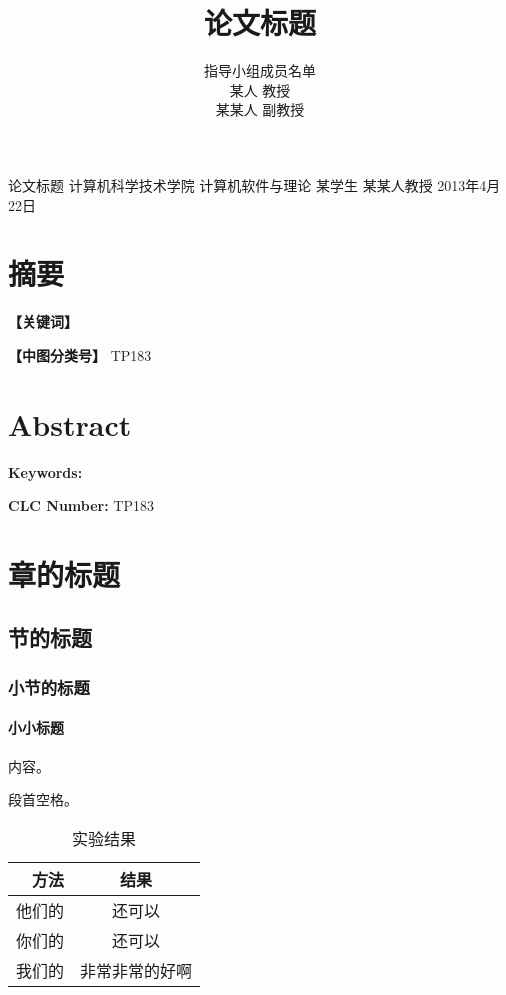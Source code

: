 \documentclass{fudan}
\title{论文标题}
\author{
指导小组成员名单\vspace{1em}\\
某\hspace{1em}人 \hspace{1em} 教\hspace{1em}授\\
某某人 \hspace{1em} 副教授\\
}
\date{}
\begin{document}
%
{论文标题}%
{计算机科学技术学院}%
{计算机软件与理论}%
{某学生}%
{某某人\hspace{1.5em}教授}%
{2013年4月22日}

\maketitle

\tableofcontents

\frontmatter

\chapter{摘\hspace{1.5em}要}

\textbf{【关键词】}

\textbf{【中图分类号】} TP183

\chapter{Abstract}

\textbf{Keywords:}

\textbf{CLC Number:} TP183

\mainmatter

\chapter{章的标题}

\section{节的标题}

\subsection{小节的标题}

\subsubsection{小小标题}

内容。

段首空格。

\begin{table}[!h]
\begin{center}
\begin{tabular}{r|c}
\hline\hline
方法 & 结果 \\
\hline
他们的 & 还可以 \\
你们的 & 还可以 \\
我们的 & 非常非常的好啊 \\
\hline\hline
\end{tabular}
\end{center}
\caption{实验结果}
\end{table}
\end{document}
